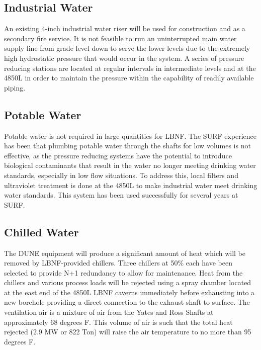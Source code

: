 \subsection{Industrial Water}
\label{sec:fscf-und-ind-h2o}

An existing 4-inch industrial water riser will be used for construction and as a secondary fire service. It is not feasible to run an uninterrupted main water supply line from grade level down to serve the lower levels due to the extremely high hydrostatic pressure that would occur in the system. A series of pressure reducing stations are located at regular intervals in intermediate levels and at the 4850L in order to maintain the pressure within the capability of readily available piping.

\subsection{Potable Water}
\label{sec:fscf-und-pot-h2o}

Potable water is not required in large quantities for LBNF. The SURF experience has been that plumbing potable water through the shafts for low volumes is not effective, as the pressure reducing systems have the potential to introduce biological contaminants that result in the water no longer meeting drinking water standards, especially in low flow situations. To address this, local filters and ultraviolet treatment is done at the 4850L to make industrial water meet drinking water standards. This system has been used successfully for several years at SURF.

\subsection{Chilled Water}
\label{sec:fscf-und-ch-h2o}

The DUNE equipment will produce a significant amount of heat which will be removed by LBNF-provided chillers. Three chillers at 50\% each have been selected to provide N+1 redundancy to allow for maintenance. Heat from the chillers and various process loads will be rejected using a spray chamber located at the east end of the 4850L LBNF caverns immediately before exhausting into a new borehole providing a direct connection to the exhaust shaft to surface. The ventilation air is a mixture of air from the Yates and Ross Shafts at approximately 68 degrees F. This volume of air is such that the total heat rejected (2.9 MW or 822 Ton) will raise the air temperature to no more than 95 degrees F. 

